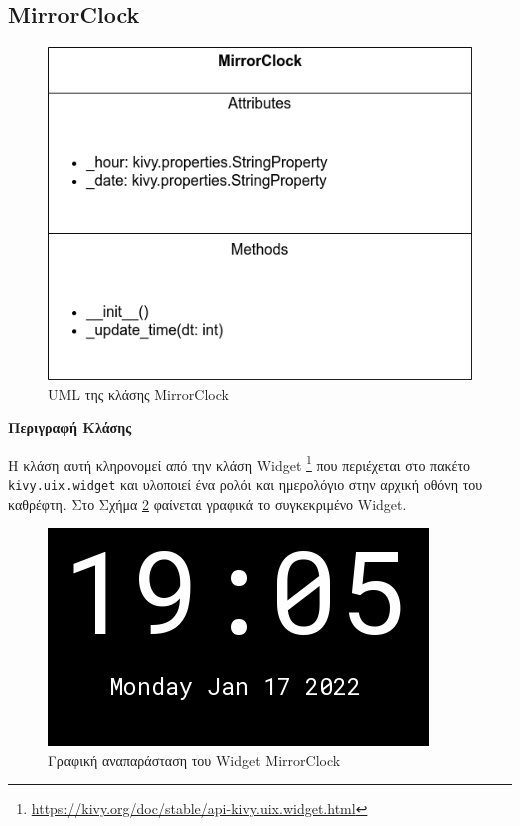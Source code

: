 \subsection{MirrorClock}
\begin{figure}[h]
	\centering
	\includegraphics[scale=0.7]{images/chapter4/uml_diagrams/MirrorClock.png}
	\caption{UML της κλάσης MirrorClock}
	\label{fig:mirrorclock}
\end{figure}
\noindent\textbf{Περιγραφή Κλάσης}

Η κλάση αυτή κληρονομεί από την κλάση Widget \footnote{\href{https://kivy.org/doc/stable/api-kivy.uix.widget.html}{https://kivy.org/doc/stable/api-kivy.uix.widget.html}} που περιέχεται στο πακέτο \texttt{kivy.uix.widget} και υλοποιεί ένα ρολόι και ημερολόγιο στην αρχική οθόνη του καθρέφτη. Στο Σχήμα \ref{fig:clock_widget} φαίνεται γραφικά το συγκεκριμένο Widget.

\begin{figure}[h!]
	\centering
	\includegraphics[scale=0.7]{images/chapter4/clock_widget.png}
	\caption{Γραφική αναπαράσταση του Widget MirrorClock}
	\label{fig:clock_widget}
\end{figure}


